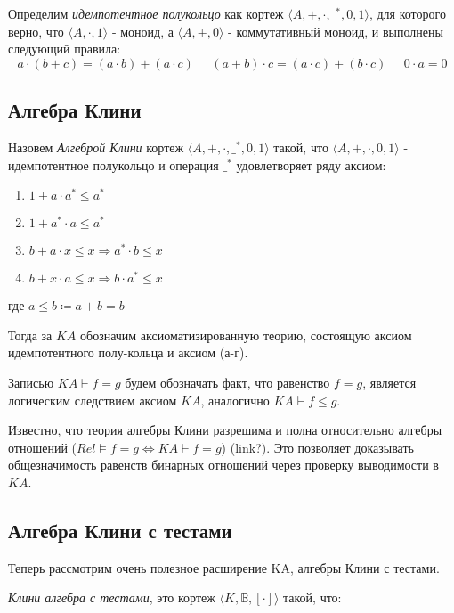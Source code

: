 \documentclass[times
              ]{itmo-student-thesis}
\begin{document}
      Определим \textit{идемпотентное полукольцо} как кортеж $ \langle A,+,\cdot,\_^*,0,1 \rangle$, для которого верно, что
      $ \langle A, \cdot, 1 \rangle $ - моноид,
      а $ \langle A, +, 0 \rangle $ - коммутативный моноид, и выполнены следующий правила:
      $$ a \cdot (b + c) = (a \cdot b) + (a \cdot c) \;\;\;\;\;
         (a + b) \cdot c = (a \cdot c) + (b \cdot c) \;\;\;\;\;
         0 \cdot a = 0
      $$

    \subsection{Алгебра Клини}

      Назовем \textit{Алгеброй Клини} кортеж $\langle A,+,\cdot,\_^*,0,1\rangle$ такой, что $\langle A, +, \cdot, 0, 1 \rangle$ - идемпотентное полукольцо и операция $ \_^* $ удовлетворяет ряду аксиом:
      \begin{enumerate}
        \item $ 1 + a \cdot a^* \leq a^* $
        \item $ 1 + a^* \cdot a \leq a^* $
        \item $ b + a \cdot x \leq x \Rightarrow a^* \cdot b \leq x $
        \item $ b + x \cdot a \leq x \Rightarrow b \cdot a^* \leq x $
      \end{enumerate}
      где  $ a \leq b \coloneqq a + b = b$

      Тогда за $ \mathit{KA} $ обозначим аксиоматизированную теорию, состоящую аксиом идемпотентного полу-кольца и аксиом (а-г).

      Записью $ \mathit{KA} \vdash f = g $ будем обозначать факт, что равенство $ f = g $, является логическим следствием аксиом $ \mathit{KA} $,
      аналогично $ \mathit{KA} \vdash f \leq g $.

      Известно, что теория алгебры Клини разрешима и полна относительно алгебры отношений
      ($ Rel \models f = g \Leftrightarrow \mathit{KA} \vdash f = g$) (link?).
      Это позволяет доказывать общезначимость равенств бинарных отношений через проверку выводимости в $ \mathit{KA} $.

    \subsection{Алгебра Клини с тестами}
      Теперь рассмотрим очень полезное расширение KA, алгебры Клини с тестами.

      \textit{Клини алгебра с тестами}, это кортеж $\langle K,\mathbb{B}, [\cdot] \rangle$ такой, что:
\end{document}
